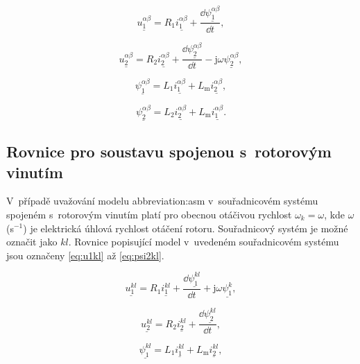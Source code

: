 \documentclass[a4paper, twoside, 11pt]{article}
\begin{document}
 \begin{equation}\label{eq:u1alphabeta}
     \underline{u_{1}^{\alpha\beta}} = R_1 \underline{i_1^{\alpha\beta}} + \frac{\dd{\underline{\psi_1^{\alpha\beta}}}}{\dd{t}},
    \end{equation}

    \begin{equation}
        \underline{u_{2}^{\alpha\beta}} = R_2 \underline{i_2^{\alpha\beta}} + \frac{\dd{\underline{\psi_2^{\alpha\beta}}}}{\dd{t}} - \text{j} \omega \underline{\psi_2^{\alpha\beta}},
    \end{equation}

    \begin{equation}
        \underline{\psi_1^{\alpha\beta}} = L_1 \underline{i_1^{\alpha\beta}} + L_\text{m} \underline{i_2^{\alpha\beta}},
    \end{equation}

    \begin{equation}\label{eq:psi2alphabeta}
        \underline{\psi_2^{\alpha\beta}} = L_2 \underline{i_2^{\alpha\beta}} + L_\text{m} \underline{i_1^{\alpha\beta}}.
    \end{equation}
    \subsection{Rovnice pro soustavu spojenou s~rotorovým vinutím}
    V~případě uvažování modelu \gls{abbreviation:asm} v~souřadnicovém systému spojeném s~rotorovým vinutím platí pro obecnou otáčivou rychlost $\omega_k = \omega$, kde $\omega$ (s$^{-1}$) je elektrická úhlová rychlost otáčení rotoru. Souřadnicový systém je možné označit jako $kl$. Rovnice popisující model v~uvedeném souřadnicovém systému jsou označeny \ref{eq:u1kl} až \ref{eq:psi2kl}.\par

 \begin{equation}\label{eq:u1kl}
     \underline{u_{1}^{kl}} = R_1 \underline{i_1^{kl}} + \frac{\dd{\underline{\psi_1^{kl}}}}{\dd{t}} + \text{j} \omega \underline{\psi_1^{k}},
    \end{equation}

    \begin{equation}
        \underline{u_{2}^{kl}} = R_2 \underline{i_2^{kl}} + \frac{\dd{\underline{\psi_2^{kl}}}}{\dd{t}},
    \end{equation}

    \begin{equation}
        \underline{\psi_1^{kl}} = L_1 \underline{i_1^{kl}} + L_\text{m} \underline{i_2^{kl}},
    \end{equation}
\end{document}

